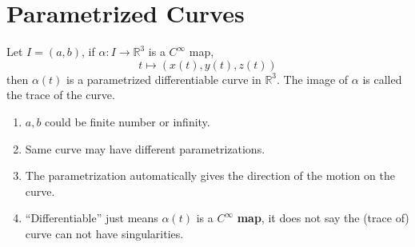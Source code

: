 \section{Parametrized Curves}
\begin{definition}
    Let $I=(a,b)$, if $\alpha\colon I\to \mathbb{R}^3$ is a $C^\infty$ map,
    \[t \mapsto (x(t),y(t),z(t))\]
    then $\alpha(t)$ is a parametrized differentiable curve in $\mathbb{R}^3$. The image of $\alpha$ is called the trace of the curve. 
\end{definition}
\begin{remark}
    \hfill
    \begin{enumerate}[1)]
        \item $a,b$ could be finite number or infinity.
        \item Same curve may have different parametrizations.
        \item The parametrization automatically gives the direction of the motion on the curve.
        \item ``Differentiable'' just means $\alpha(t)$ is a $C^\infty$ \textbf{map}, it does not say the (trace of) curve can not have singularities.
    \end{enumerate}
\end{remark}
